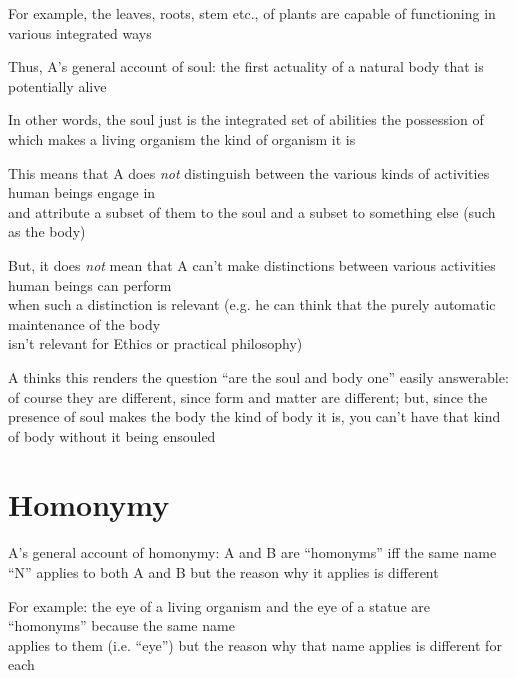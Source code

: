 \documentclass[11pt]{article}
\begin{document}
For example, the leaves, roots, stem etc., of plants are capable of functioning in various integrated ways
\vspace*{2mm}

\noindent Thus, A's general account of soul: the first actuality of a natural body that is potentially alive
\vspace*{2mm}

\noindent In other words, the soul just is the integrated set of abilities the possession of which makes a living organism the kind of organism it is
\newpage

This means that A does \emph{not} distinguish between the various kinds of activities human beings engage in\\\hspace*{6mm}and attribute a subset of them to the soul and a subset to something else (such as the body)
\vspace*{1mm}

But, it does \emph{not} mean that A can't make distinctions between various activities human beings can perform\\\hspace*{6mm}when such a distinction is relevant (e.g. he can think that the purely automatic maintenance of the body\\\hspace*{6mm}isn't relevant for Ethics or practical philosophy)
\vspace*{2mm}

\noindent A thinks this renders the question ``are the soul and body one'' easily answerable: of course they are different, since form and matter are different; but, since the presence of soul makes the body the kind of body it is, you can't have that kind of body without it being ensouled

\section*{Homonymy}

\noindent A's general account of homonymy: A and B are ``homonyms'' iff the same name ``N'' applies to both A and B but the reason why it applies is different
\vspace*{2mm}

For example: the eye of a living organism and the eye of a statue are ``homonyms'' because the same name\\\hspace*{6mm}applies to them (i.e. ``eye'') but the reason why that name applies is different for each
\vspace*{1mm}
\end{document}
